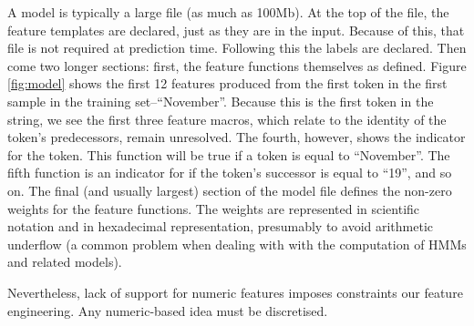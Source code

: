 A model is typically a large file (as much as 100Mb). At the top of the file, the feature templates are declared, just as they are in the input. Because of this, that file is not required at prediction time. Following this the labels are declared. Then come two longer sections: first, the feature functions themselves as defined. Figure \ref{fig:model} shows the first 12 features produced from the first token in the first sample in the training set--``November''. Because this is the first token in the string, we see the first three feature macros, which relate to the identity of the token's predecessors, remain unresolved. The fourth, however, shows the indicator for the token. This function will be true if a token is equal to ``November''. The fifth function is an indicator for if the token's successor is equal to ``19'', and so on. The final (and usually largest) section of the model file defines the non-zero weights for the feature functions. The weights are represented in scientific notation and in hexadecimal representation, presumably to avoid arithmetic underflow (a common problem when dealing with with the computation of HMMs and related models).

Nevertheless, lack of support for numeric features imposes constraints our feature engineering. Any numeric-based idea must be discretised.
